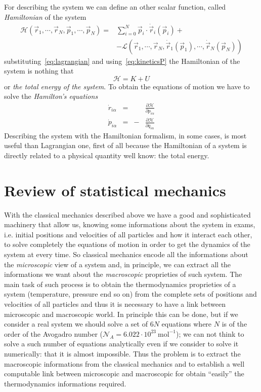 For describing the system we can define an other scalar function, called \textit{Hamiltonian} of the system
\begin{align*}
	\mathcal{H}(\vec r_1,\cdots,\vec r_N, \vec p_1, \cdots, \vec p_N) = &\sum_{i=0}^N \vec p_i \cdot \dot{\vec r}_i(\vec p_i) + \nonumber \\
	&-\mathcal{L}(\vec r_1, \cdots, \vec r_N, \dot{\vec r}_1(\vec p_1),\cdots,\dot{\vec r}_N(\vec p_N))
\end{align*}
substituting~\eqref{eq:lagrangian} and using~\eqref{eq:kineticsP} the Hamiltonian of the system is nothing that
\begin{equation*}
	\mathcal{H} = K + U
\end{equation*}
or \textit{the total energy of the system}. To obtain the equations of motion we have to solve the \textit{Hamilton's equations}
\begin{equation*}
	\begin{aligned}
		\dot r_{i\alpha} &=& &\frac{\partial\mathcal{H}}{\partial p_{i\alpha}} \\
		\dot p_{i\alpha} &=&-&\frac{\partial\mathcal{H}}{\partial q_{i\alpha}}
	\end{aligned}
\end{equation*}
Describing the system with the Hamiltonian formalism, in some cases, is most useful than Lagrangian one, first of all because the Hamiltonian of a system is directly related to a physical quantity well know: the total energy.

\section{Review of statistical mechanics}
With the classical mechanics described above we have a good and sophisticated machinery that allow us, knowing some informations about the system in exams, i.e. initial positions and velocities of all particles and how it interact each other, to solve completely the equations of motion in order to get the dynamics of the system at every time. So classical mechanics encode all the informations about the \textit{microscopic} view of a system and, in principle, we can extract all the informations we want about the \textit{macroscopic} proprieties of such system. The main task of such process is to obtain the thermodynamics proprieties of a system (temperature, pressure end so on) from the complete sets of positions and velocities of all particles and thus it is necessary to have a link between microscopic and macroscopic world. In principle this can be done, but if we consider a real system we should solve a set of $6N$ equations where $N$ is of the order of the Avogadro number ($\mathcal{N}_A = 6.022 \cdot 10^{23}~\text{mol}^{-1}$); we can not think to solve a such number of equations analytically even if we consider to solve it numerically: that it is almost impossible. Thus the problem is to extract the macroscopic informations from the classical mechanics and to establish a well computable link between microscopic and macroscopic for obtain ``easily'' the thermodynamics informations required.

